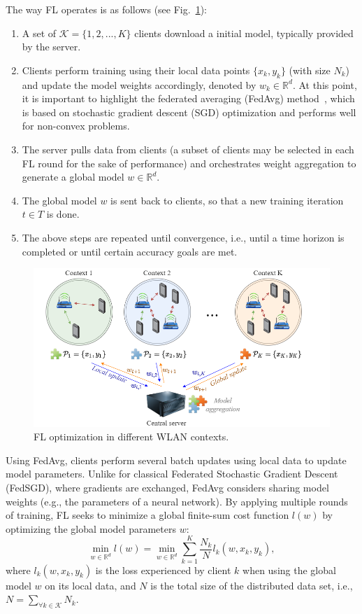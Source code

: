 \documentclass[10pt,a4paper,twocolumn]{article}
\newcommand{\ITUpar}{\vspace{8pt}\par}
\def\startfigure{\vspace{6pt}\begin{figure}[ht]\center}
\begin{document}
The way FL operates is as follows (see Fig.~\ref{fig:federated_optimization}): 
\begin{enumerate}
	\item A set of $\mathcal{K}=\{1,2,...,K\}$ clients download a initial model, typically provided by the server.
	\item Clients perform training using their local data points $\{x_k,y_k\}$ (with size $N_k$) and update the model weights accordingly, denoted by $w_k\in \mathbb{R}^d$. At this point, it is important to highlight the federated averaging (FedAvg) method~\cite{mcmahan2017communication}, which is based on stochastic gradient descent (SGD) optimization and performs well for non-convex problems. 
	\item The server pulls data from clients (a subset of clients may be selected in each FL round for the sake of performance)  and orchestrates weight aggregation to generate a global model $w\in \mathbb{R}^d$.
	\item The global model $w$ is sent back to clients, so that a new training iteration $t\in T$ is done.
	\item The above steps are repeated until convergence, i.e., until a time horizon is completed or until certain accuracy goals are met. 
\end{enumerate} 

\startfigure
\includegraphics[width=\columnwidth]{img/federated_optimization}
\caption{FL optimization in different WLAN contexts.}\label{fig:federated_optimization} 
\end{figure}

Using FedAvg, clients perform several batch updates using local data to update model parameters. Unlike for classical Federated Stochastic Gradient Descent (FedSGD), where gradients are exchanged, FedAvg considers sharing model weights (e.g., the parameters of a neural network). By applying multiple rounds of training, FL seeks to minimize a global finite-sum cost function $l(w)$ by optimizing the global model parameters $w$:
\begin{equation}
	\min_{w \in \mathbb{R}^d} l(w) = \min_{w\in \mathbb{R}^d} \sum_{k=1}^{K} \frac{N_k}{N} l_k(w,x_k,y_k),
	\label{eq:fl_loss_goal}
\end{equation}
where $l_k(w,x_k,y_k)$ is the loss experienced by client $k$ when using the global model $w$ on its local data, and $N$ is the total size of the distributed data set, i.e., $N = \sum_{\forall k \in \mathcal{K}} N_k$.\ITUpar
\end{document}
